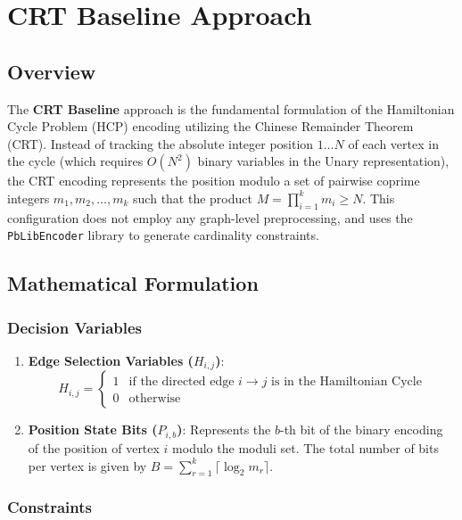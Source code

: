 \section{CRT Baseline Approach}
\label{sec:crt_baseline}

\subsection{Overview}
The \textbf{CRT Baseline} approach is the fundamental formulation of the Hamiltonian Cycle Problem (HCP) encoding utilizing the Chinese Remainder Theorem (CRT).
Instead of tracking the absolute integer position $1 \ldots N$ of each vertex in the cycle (which requires $O(N^2)$ binary variables in the Unary representation), the CRT encoding represents the position modulo a set of pairwise coprime integers $m_1, m_2, \dots, m_k$ such that the product $M = \prod_{i=1}^k m_i \ge N$.
This configuration does not employ any graph-level preprocessing, and uses the \texttt{PbLibEncoder} library to generate cardinality constraints.

\subsection{Mathematical Formulation}

\subsubsection{Decision Variables}
\begin{enumerate}
    \item \textbf{Edge Selection Variables ($H_{i,j}$)}: 
    \begin{equation}
        H_{i,j} = \begin{cases} 
        1 & \text{if the directed edge } i \to j \text{ is in the Hamiltonian Cycle} \\
        0 & \text{otherwise}
        \end{cases}
    \end{equation}
    \item \textbf{Position State Bits ($P_{i,b}$)}:
    Represents the $b$-th bit of the binary encoding of the position of vertex $i$ modulo the moduli set. The total number of bits per vertex is given by $B = \sum_{r=1}^k \lceil \log_2 m_r \rceil$.
\end{enumerate}

\subsubsection{Constraints}

